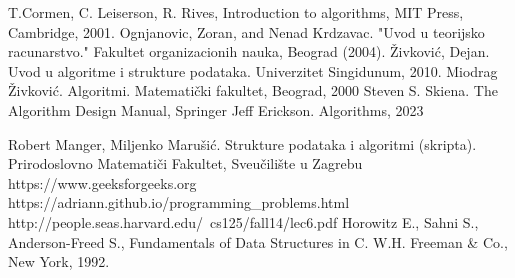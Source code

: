 \documentclass[b4paper,12pt]{book}
\begin{document}


 


\backmatter
\begin{thebibliography}{9}
	T.Cormen, C. Leiserson, R. Rives, Introduction to algorithms, MIT Press, Cambridge, 2001.
	Ognjanovic, Zoran, and Nenad Krdzavac. "Uvod u teorijsko racunarstvo." Fakultet organizacionih nauka, Beograd (2004).
	Živković, Dejan. Uvod u algoritme i strukture podataka. Univerzitet Singidunum, 2010.
    Miodrag Živković. Algoritmi. Matematički fakultet, Beograd, 2000
    Steven S. Skiena. The Algorithm Design Manual, Springer
     Jeff Erickson. Algorithms, 2023
    
     Robert Manger, Miljenko Marušić. Strukture podataka i algoritmi (skripta).
    Prirodoslovno Matematiči Fakultet, Sveučilište u Zagrebu
    https://www.geeksforgeeks.org
      {https://adriann.github.io/programming\_problems.html}
    http://people.seas.harvard.edu/~cs125/fall14/lec6.pdf
     Horowitz E., Sahni S., Anderson-Freed S., Fundamentals of Data Structures in C. W.H. Freeman \& Co., New York, 1992.
\end{thebibliography}
\end{document}

